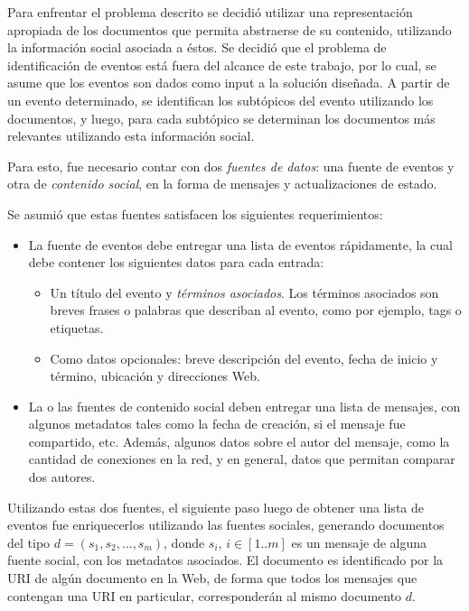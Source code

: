 \documentclass[upright, contnum]{umemoria}
\begin{document}
\label{descdet}


   Para enfrentar el problema descrito se decidió utilizar una
   representación apropiada de los documentos que permita abstraerse
   de su contenido, utilizando la información social asociada a
   éstos. Se decidió que el problema de identificación de eventos está
   fuera del alcance de este trabajo, por lo cual, se asume que los
   eventos son dados como input a la solución diseñada. A partir de un
   evento determinado, se identifican los  subtópicos del evento
   utilizando los documentos, y luego, para cada 
   subtópico se determinan los documentos más relevantes utilizando
   esta información social.

   Para esto, fue necesario contar con dos \emph{fuentes de datos}: una
   fuente de eventos y otra de \emph{contenido social}, en la forma de
   mensajes y actualizaciones de estado.  

   Se asumió que estas fuentes satisfacen los siguientes
   requerimientos:

\begin{itemize}
\item La fuente de eventos debe entregar una lista de eventos
     rápidamente, la cual debe contener los siguientes datos para
     cada entrada:

\begin{itemize}
\item Un título del evento y \emph{términos asociados}. Los términos
       asociados son breves frases o palabras que describan al
       evento, como por ejemplo, tags o etiquetas.
\item Como datos opcionales: breve descripción del evento, fecha de
       inicio y término, ubicación y direcciones Web.
\end{itemize}

\item La o las fuentes de contenido social deben entregar una lista de
     mensajes, con algunos metadatos tales como la fecha de creación,
     si el mensaje fue compartido, etc. Además, algunos datos sobre el
     autor del mensaje, como la cantidad de conexiones en la red, y
     en general, datos que permitan comparar dos autores.
\end{itemize}
   Utilizando estas dos fuentes, el siguiente paso luego de obtener
   una lista de eventos fue enriquecerlos utilizando las fuentes
   sociales, generando documentos del tipo 
   $d = (s_1, s_2, \ldots, s_m)$, donde  $s_i$, $i \in [1..m]$ 
   es un mensaje de alguna fuente social, con los
   metadatos asociados. El documento es identificado por la URI de
   algún documento en la Web, de forma que todos los mensajes que
   contengan una URI en particular, corresponderán al mismo documento
   $d$.
\end{document}
